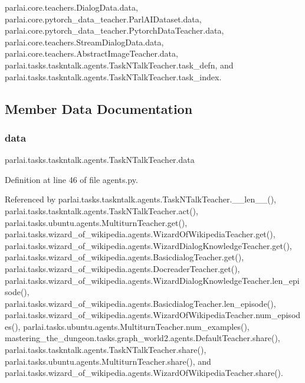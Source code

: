 parlai.\+core.\+teachers.\+Dialog\+Data.\+data, parlai.\+core.\+pytorch\+\_\+data\+\_\+teacher.\+Parl\+A\+I\+Dataset.\+data, parlai.\+core.\+pytorch\+\_\+data\+\_\+teacher.\+Pytorch\+Data\+Teacher.\+data, parlai.\+core.\+teachers.\+Stream\+Dialog\+Data.\+data, parlai.\+core.\+teachers.\+Abstract\+Image\+Teacher.\+data, parlai.\+tasks.\+taskntalk.\+agents.\+Task\+N\+Talk\+Teacher.\+task\+\_\+defn, and parlai.\+tasks.\+taskntalk.\+agents.\+Task\+N\+Talk\+Teacher.\+task\+\_\+index.



\subsection{Member Data Documentation}
\mbox{\label{classparlai_1_1tasks_1_1taskntalk_1_1agents_1_1TaskNTalkTeacher_ac5d7a2f765aaef625b2ec990298f3886}} 
\subsubsection{\texorpdfstring{data}{data}}
{\footnotesize\ttfamily parlai.\+tasks.\+taskntalk.\+agents.\+Task\+N\+Talk\+Teacher.\+data}



Definition at line 46 of file agents.\+py.



Referenced by parlai.\+tasks.\+taskntalk.\+agents.\+Task\+N\+Talk\+Teacher.\+\_\+\+\_\+len\+\_\+\+\_\+(), parlai.\+tasks.\+taskntalk.\+agents.\+Task\+N\+Talk\+Teacher.\+act(), parlai.\+tasks.\+ubuntu.\+agents.\+Multiturn\+Teacher.\+get(), parlai.\+tasks.\+wizard\+\_\+of\+\_\+wikipedia.\+agents.\+Wizard\+Of\+Wikipedia\+Teacher.\+get(), parlai.\+tasks.\+wizard\+\_\+of\+\_\+wikipedia.\+agents.\+Wizard\+Dialog\+Knowledge\+Teacher.\+get(), parlai.\+tasks.\+wizard\+\_\+of\+\_\+wikipedia.\+agents.\+Basicdialog\+Teacher.\+get(), parlai.\+tasks.\+wizard\+\_\+of\+\_\+wikipedia.\+agents.\+Docreader\+Teacher.\+get(), parlai.\+tasks.\+wizard\+\_\+of\+\_\+wikipedia.\+agents.\+Wizard\+Dialog\+Knowledge\+Teacher.\+len\+\_\+episode(), parlai.\+tasks.\+wizard\+\_\+of\+\_\+wikipedia.\+agents.\+Basicdialog\+Teacher.\+len\+\_\+episode(), parlai.\+tasks.\+wizard\+\_\+of\+\_\+wikipedia.\+agents.\+Wizard\+Of\+Wikipedia\+Teacher.\+num\+\_\+episodes(), parlai.\+tasks.\+ubuntu.\+agents.\+Multiturn\+Teacher.\+num\+\_\+examples(), mastering\+\_\+the\+\_\+dungeon.\+tasks.\+graph\+\_\+world2.\+agents.\+Default\+Teacher.\+share(), parlai.\+tasks.\+taskntalk.\+agents.\+Task\+N\+Talk\+Teacher.\+share(), parlai.\+tasks.\+ubuntu.\+agents.\+Multiturn\+Teacher.\+share(), and parlai.\+tasks.\+wizard\+\_\+of\+\_\+wikipedia.\+agents.\+Wizard\+Of\+Wikipedia\+Teacher.\+share().

